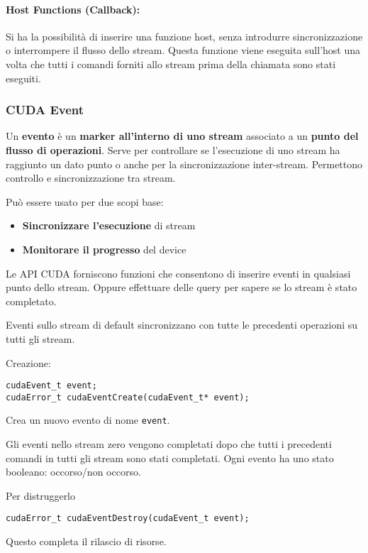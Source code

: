 \paragraph{Host Functions (Callback):} Si ha la possibilità di inserire una funzione host, senza introdurre sincronizzazione o interrompere il flusso dello stream. Questa funzione viene eseguita sull'host una volta che tutti i comandi forniti allo stream prima della chiamata sono stati eseguiti.

\subsubsection{CUDA Event}

Un \textbf{evento} è un \textbf{marker all'interno di uno stream} associato a un \textbf{punto del flusso di operazioni}. Serve per controllare se l'esecuzione di uno stream ha raggiunto un dato punto o anche per la sincronizzazione inter-stream. Permettono controllo e sincronizzazione tra stream.

Può essere usato per due scopi base:
\begin{itemize}
	\item \textbf{Sincronizzare l'esecuzione} di stream
	
	\item \textbf{Monitorare il progresso} del device
\end{itemize}

Le API CUDA forniscono funzioni che consentono di inserire eventi in qualsiasi punto dello stream. Oppure effettuare delle query per sapere se lo stream è stato completato. 

Eventi sullo stream di default sincronizzano con tutte le precedenti operazioni su tutti gli stream.

Creazione:
\begin{verbatim}
cudaEvent_t event;
cudaError_t cudaEventCreate(cudaEvent_t* event);
\end{verbatim}
Crea un nuovo evento di nome \texttt{event}.

Gli eventi nello stream zero vengono completati dopo che tutti i precedenti comandi in tutti gli stream sono stati completati. Ogni evento ha uno stato booleano: occorso/non occorso.

Per distruggerlo
\begin{verbatim}
cudaError_t cudaEventDestroy(cudaEvent_t event);
\end{verbatim}

Questo completa il rilascio di risorse.

